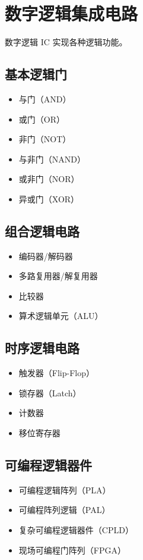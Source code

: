 \section{数字逻辑集成电路}

数字逻辑 IC 实现各种逻辑功能。

\subsection{基本逻辑门}

\begin{itemize}
  \item 与门（AND）
  \item 或门（OR）
  \item 非门（NOT）
  \item 与非门（NAND）
  \item 或非门（NOR）
  \item 异或门（XOR）
\end{itemize}

\subsection{组合逻辑电路}

\begin{itemize}
  \item 编码器/解码器
  \item 多路复用器/解复用器
  \item 比较器
  \item 算术逻辑单元（ALU）
\end{itemize}

\subsection{时序逻辑电路}

\begin{itemize}
  \item 触发器（Flip-Flop）
  \item 锁存器（Latch）
  \item 计数器
  \item 移位寄存器
\end{itemize}

\subsection{可编程逻辑器件}

\begin{itemize}
  \item 可编程逻辑阵列（PLA）
  \item 可编程阵列逻辑（PAL）
  \item 复杂可编程逻辑器件（CPLD）
  \item 现场可编程门阵列（FPGA）
\end{itemize}

